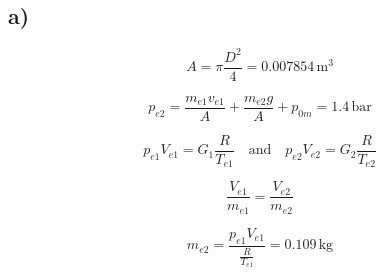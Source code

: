 

\subsection*{a)}

\[
A = \pi \frac{D^2}{4} = 0.007854 \, \text{m}^3
\]

\[
p_{e2} = \frac{m_{e1} v_{e1}}{A} + \frac{m_{e2} g}{A} + p_{0m} = 1.4 \, \text{bar}
\]

\[
p_{e1} V_{e1} = G_1 \frac{R}{T_{e1}} \quad \text{and} \quad p_{e2} V_{e2} = G_2 \frac{R}{T_{e2}}
\]

\[
\frac{V_{e1}}{m_{e1}} = \frac{V_{e2}}{m_{e2}}
\]

\[
m_{e2} = \frac{p_{e1} V_{e1}}{\frac{R}{T_{e1}}} = 0.109 \, \text{kg}
\]